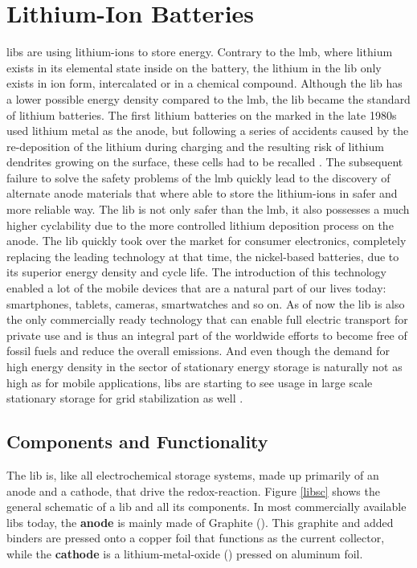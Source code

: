 \section{Lithium-Ion Batteries}
\glspl{lib} are using lithium-ions to store energy. Contrary to the \gls{lmb}, where lithium exists in its elemental state inside on the battery, the lithium in the \gls{lib} only exists in ion form, intercalated or in a chemical compound. Although the \gls{lib} has a lower possible energy density compared to the \gls{lmb}, the \gls{lib} became the standard of lithium batteries. The first lithium batteries on the marked in the late 1980s used lithium metal as the anode, but following a series of accidents caused by the re-deposition of the lithium during charging and the resulting risk of lithium dendrites growing on the surface, these cells had to be recalled \cite{K.Brandt.1994}. The subsequent failure to solve the safety problems of the \gls{lmb} quickly lead to the discovery of alternate anode materials that where able to store the lithium-ions in safer and more reliable way. The \gls{lib} is not only safer than the \gls{lmb}, it also possesses a much higher cyclability due to the more controlled lithium deposition process on the anode. The \gls{lib} quickly took over the market for consumer electronics, completely replacing the leading technology at that time, the nickel-based batteries, due to its superior energy density and cycle life. The introduction of this technology enabled a lot of the mobile devices that are a natural part of our lives today: smartphones, tablets, cameras, smartwatches and so on. As of now the \gls{lib} is also the only commercially ready technology that can enable full electric transport for private use and is thus an integral part of the worldwide efforts to become free of fossil fuels and reduce the overall  emissions. And even though the demand for high energy density in the sector of stationary energy storage is naturally not as high as for mobile applications, \glspl{lib} are starting to see usage in large scale stationary storage for grid stabilization as well \cite{Guthrie.2020}.    

\subsection{Components and Functionality}
The \gls{lib} is, like all electrochemical storage systems, made up primarily of an anode and a cathode, that drive the redox-reaction. Figure \ref{libsc} shows the general schematic of a \gls{lib} and all its components. In most commercially available \glspl{lib} today, the \textbf{anode} is mainly made of Graphite  (). This graphite and added binders are pressed onto a copper foil that functions as the current collector, while the \textbf{cathode} is a lithium-metal-oxide () pressed on aluminum foil.

